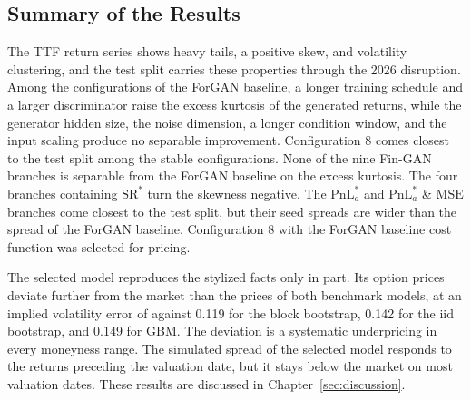 \subsection{Summary of the Results}\label{sec:results-summary}
The TTF return series shows heavy tails, a positive skew, and volatility clustering, and the test split carries these properties through the 2026 disruption. Among the configurations of the ForGAN baseline, a longer training schedule and a larger discriminator raise the excess kurtosis of the generated returns, while the generator hidden size, the noise dimension, a longer condition window, and the input scaling produce no separable improvement. Configuration 8 comes closest to the test split among the stable configurations. None of the nine Fin-GAN branches is separable from the ForGAN baseline on the excess kurtosis. The four branches containing $\mathrm{SR}^{*}$ turn the skewness negative. The $\mathrm{PnL}^{*}_{a}$ and $\mathrm{PnL}^{*}_{a}$ \& $\mathrm{MSE}$ branches come closest to the test split, but their seed spreads are wider than the spread of the ForGAN baseline. Configuration 8 with the ForGAN baseline cost function was selected for pricing.

The selected model reproduces the stylized facts only in part. Its option prices deviate further from the market than the prices of both benchmark models, at an implied volatility error of  against \num{0.119} for the block bootstrap, \num{0.142} for the $\mathrm{iid}$ bootstrap, and \num{0.149} for GBM. The deviation is a systematic underpricing in every moneyness range. The simulated spread of the selected model responds to the returns preceding the valuation date, but it stays below the market on most valuation dates. These results are discussed in Chapter~\ref{sec:discussion}.